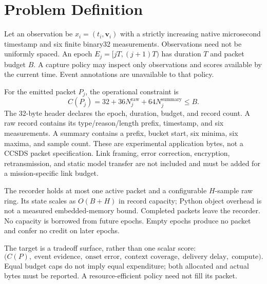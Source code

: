 \section{Problem Definition}
Let an observation be $x_i=(t_i,\mathbf{v}_i)$ with a strictly increasing native
microsecond timestamp and six finite binary32 measurements. Observations need
not be uniformly spaced. An epoch $E_j=[jT,(j+1)T)$ has duration $T$ and packet
budget $B$. A capture policy may inspect only observations and scores available
by the current time. Event annotations are unavailable to that policy.

For the emitted packet $P_j$, the operational constraint is
\begin{equation}
 C(P_j)=32+36N_j^{\mathrm{raw}}+64N_j^{\mathrm{summary}}\leq B.
 \label{eq:budget}
\end{equation}
The 32-byte header declares the epoch, duration, budget, and record count. A raw
record contains its type/reason/length prefix, timestamp, and six measurements.
A summary contains a prefix, bucket start, six minima, six maxima, and sample
count. These are experimental application bytes, not a CCSDS packet specification.
Link framing, error correction, encryption, retransmission, and static model
transfer are not included and must be added for a mission-specific link budget.

The recorder holds at most one active packet and a configurable $H$-sample raw
ring. Its state scales as $O(B+H)$ in record capacity; Python object overhead is
not a measured embedded-memory bound. Completed packets leave the recorder.
No capacity is borrowed from future epochs. Empty epochs produce no packet and
confer no credit on later epochs.

The target is a tradeoff surface, rather than one scalar score:
\begin{equation}
 \bigl(C(P),\;\text{event evidence},\;\text{onset error},\;
 \text{context coverage},\;\text{delivery delay},\;\text{compute}\bigr).
\end{equation}
Equal budget caps do not imply equal expenditure; both allocated and actual bytes
must be reported. A resource-efficient policy need not fill its packet.
